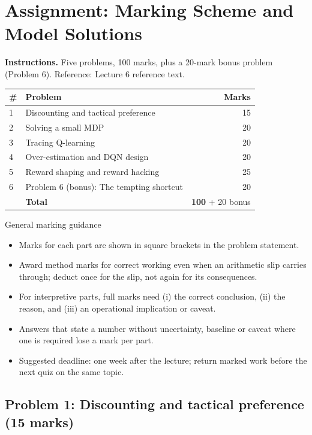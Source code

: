 \documentclass[11pt]{article}
\begin{document}
\section{Assignment: Marking Scheme and Model Solutions}

\textbf{Instructions.} Five problems, 100 marks, plus a 20-mark bonus problem (Problem 6). Reference: Lecture 6 reference text.

\begin{center}\small\renewcommand{\arraystretch}{1.25}\begin{tabularx}{0.85\textwidth}{@{}l X r@{}}\toprule\textbf{\#} & \textbf{Problem} & \textbf{Marks}\\\midrule1 & Discounting and tactical preference & 15\\
2 & Solving a small MDP & 20\\
3 & Tracing Q-learning & 20\\
4 & Over-estimation and DQN design & 20\\
5 & Reward shaping and reward hacking & 25\\
6 & Problem 6 (bonus): The tempting shortcut & 20\\\midrule & \textbf{Total} & \textbf{100} + 20 bonus\\\bottomrule\end{tabularx}\end{center}

\begin{instr}{General marking guidance}\begin{itemize}
\item Marks for each part are shown in square brackets in the problem statement.
\item Award method marks for correct working even when an arithmetic slip carries through; deduct once for the slip, not again for its consequences.
\item For interpretive parts, full marks need (i) the correct conclusion, (ii) the reason, and (iii) an operational implication or caveat.
\item Answers that state a number without uncertainty, baseline or caveat where one is required lose a mark per part.
\item Suggested deadline: one week after the lecture; return marked work before the next quiz on the same topic.
\end{itemize}\end{instr}

\subsection{Problem 1: Discounting and tactical preference \normalfont\small\color{GreyN}(15 marks)}
\end{document}
